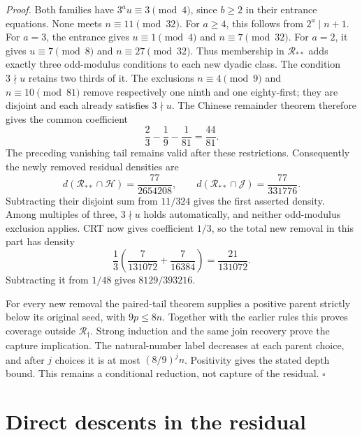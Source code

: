 \documentclass[11pt,letterpaper]{article}
\newenvironment{proof}{\noindent\textit{Proof.}}{\hfill\(\square\)}
\begin{document}
\begin{proof}
Both families have \(3^a u\equiv3\pmod4\), since \(b\ge2\)
in their entrance equations. None meets \(n\equiv11\pmod{32}\).
For \(a\ge4\), this follows from \(2^a\mid n+1\).
For \(a=3\), the entrance gives \(u\equiv1\pmod4\) and
\(n\equiv7\pmod{32}\). For \(a=2\), it gives
\(u\equiv7\pmod8\) and \(n\equiv27\pmod{32}\).
Thus membership in \(\mathcal R_{**}\) adds exactly three odd-modulus
conditions to each new dyadic class. The condition \(3\nmid u\)
retains two thirds of it. The exclusions \(n\equiv4\pmod9\) and
\(n\equiv10\pmod{81}\) remove respectively one ninth and one
eighty-first; they are disjoint and each already satisfies \(3\nmid u\).
The Chinese remainder theorem therefore gives the common coefficient
\[
\frac23-\frac19-\frac1{81}=\frac{44}{81}.
\]
The preceding vanishing tail remains valid after these restrictions.
Consequently the newly removed residual densities are
\[
d(\mathcal R_{**}\cap\mathcal H)=\frac{77}{2654208},\qquad
 d(\mathcal R_{**}\cap\mathcal J)=\frac{77}{331776}.
\]
Subtracting their disjoint sum from \(11/324\) gives the first asserted
density. Among multiples of three, \(3\nmid u\) holds automatically,
and neither odd-modulus exclusion applies. CRT now gives coefficient
\(1/3\), so the total new removal in this part has density
\[
\frac13\left(\frac7{131072}+\frac7{16384}\right)=\frac{21}{131072}.
\]
Subtracting it from \(1/48\) gives \(8129/393216\).

For every new removal the paired-tail theorem supplies a positive
parent strictly below its original seed, with \(9p\le8n\).
Together with the earlier rules this proves coverage outside
\(\mathcal R_{\dagger}\). Strong induction and the same join recovery
prove the capture implication. The natural-number label decreases
at each parent choice, and after \(j\) choices it is at most
\((8/9)^j n\). Positivity gives the stated depth bound.
This remains a conditional reduction, not capture of the residual.
\end{proof}

\section{Direct descents in the residual}
\end{document}
